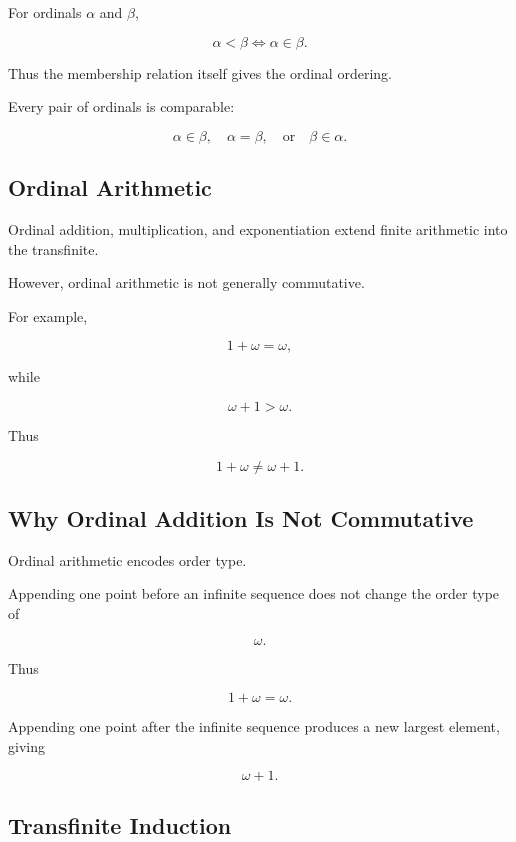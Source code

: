 For ordinals \(\alpha\) and \(\beta\),

\[
\boxed{
\alpha<\beta
\iff
\alpha\in\beta.
}
\]

Thus the membership relation itself gives the ordinal ordering.

Every pair of ordinals is comparable:

\[
\boxed{
\alpha\in\beta,
\quad
\alpha=\beta,
\quad
\text{or}
\quad
\beta\in\alpha.
}
\]

\subsection{Ordinal Arithmetic}
\label{subsec:ordinal-arithmetic}

Ordinal addition, multiplication, and exponentiation extend finite
arithmetic into the transfinite.

However, ordinal arithmetic is not generally commutative.

For example,

\[
\boxed{
1+\omega
=
\omega,
}
\]

while

\[
\boxed{
\omega+1
>
\omega.
}
\]

Thus

\[
\boxed{
1+\omega
\neq
\omega+1.
}
\]

\subsection{Why Ordinal Addition Is Not Commutative}
\label{subsec:ordinal-addition-noncommutative}

Ordinal arithmetic encodes order type.

Appending one point before an infinite sequence does not change the order
type of

\[
\omega.
\]

Thus

\[
1+\omega=\omega.
\]

Appending one point after the infinite sequence produces a new largest
element, giving

\[
\omega+1.
\]

\subsection{Transfinite Induction}
\label{subsec:transfinite-induction}

